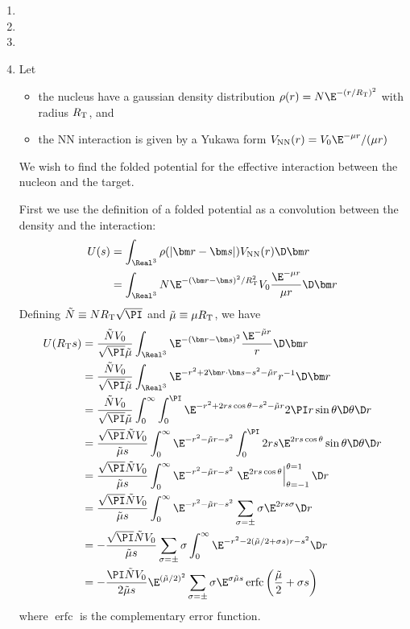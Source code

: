 \documentclass[fleqn, 12pt]{article}
\begin{document}
\begin{enumerate}
\item %

\item %

\item %

\item Let
  \begin{itemize}
  \item the nucleus have a gaussian density distribution
    $\rho(r) = N \E^{-(r / R_{\text T})^2}$ with radius $R_{\text T}$, and
  \item the NN interaction is given by a Yukawa form
    $V_{\text{NN}}(r) = V_0 \E^{-\mu r} / (\mu r)$
  \end{itemize}
  We wish to find the folded potential for the effective interaction between
  the nucleon and the target.

  First we use the definition of a folded potential as a convolution between
  the density and the interaction:
  \begin{align*}
    U(s)
    &= \int_{\Real^3} \rho(|\bm r - \bm s|) V_{\text{NN}}(r) \D \bm r \\
    &= \int_{\Real^3} N \E^{-(\bm r - \bm s)^2/R_{\text T}^2} V_0 \frac{\E^{-\mu r}}{\mu r} \D \bm r
  \end{align*}
  Defining $\tilde N \equiv N R_{\text T} \sqrt\PI$ and
  $\tilde \mu \equiv \mu R_{\text T}$, we have
  \begin{align*}
    U(R_{\text T} s)
    &= \frac{\tilde N V_0}{\sqrt\PI \tilde\mu}
      \int_{\Real^3} \E^{-(\bm r - \bm s)^2} \frac{\E^{-\tilde\mu r}}{r} \D \bm r
    \\
    &= \frac{\tilde N V_0}{\sqrt\PI \tilde\mu} \int_{\Real^3} \E^{-r^2 + 2 \bm r \cdot \bm s - s^2 - \tilde\mu r} r^{-1} \D \bm r
    \\
    &= \frac{\tilde N V_0}{\sqrt\PI \tilde\mu} \int_0^\infty \int_0^\PI \E^{-r^2 + 2 r s \cos \theta - s^2 - \tilde\mu r} 2 \PI r \sin \theta \D \theta \D r
    \\
    &= \frac{\sqrt\PI \tilde N V_0}{\tilde\mu s} \int_0^\infty \E^{-r^2 - \tilde\mu r - s^2} \int_0^\PI 2 r s \E^{2 r s \cos \theta} \sin \theta \D \theta \D r
    \\
    &= \frac{\sqrt\PI \tilde N V_0}{\tilde\mu s} \int_0^\infty \E^{-r^2 - \tilde\mu r - s^2} \left.\E^{2 r s \cos \theta}\right|_{\theta=-1}^{\theta=1} \D r
    \\
    &= \frac{\sqrt\PI \tilde N V_0}{\tilde\mu s} \int_0^\infty \E^{-r^2 - \tilde\mu r - s^2} \sum_{\sigma = \pm} \sigma \E^{2 r s \sigma} \D r
    \\
    &= -\frac{\sqrt\PI \tilde N V_0}{\tilde\mu s} \sum_{\sigma = \pm} \sigma \int_0^\infty \E^{-r^2 - 2 (\tilde\mu / 2 + \sigma s) r - s^2}\D r
    \\
    &= -\frac{\PI \tilde N V_0}{2 \tilde\mu s} \E^{(\tilde\mu / 2)^2} \sum_{\sigma  = \pm} \sigma \E^{\sigma \tilde\mu s} \operatorname{erfc}\left(\frac{\tilde\mu}{2} + \sigma s\right)
  \end{align*}
where $\operatorname{erfc}$ is the complementary error function.

\end{enumerate}
\end{document}
